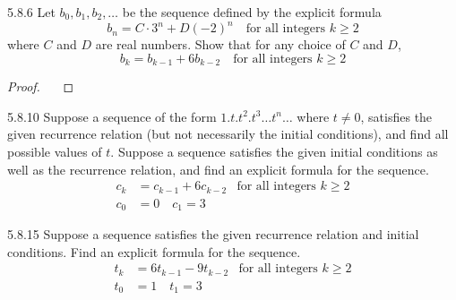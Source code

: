 \documentclass[11pt]{article}
\newcommand{\todo}{\fbox{TO-DO}\ \ } %
\begin{document}
{\raggedright}
\newcommand\NAME{Ojas Chaturvedi}  %
\newcommand\EMAILID{oj.chaturvedi.2024@gmail.com}
\newcommand\HWNUM{10} 


\begin{question}
    {5.8.6}
    {
        Let $b_0, b_1, b_2, \ldots$ be the sequence defined by the explicit formula
        \begin{equation*}
            b_n = C \cdot 3^n + D{(-2)}^n \quad \text{for all integers $k \geq 2$}
        \end{equation*}
        where $C$ and $D$ are real numbers. Show that for any choice of $C$ and $D$,
        \begin{equation*}
            b_k = b_{k-1} + 6b_{k-2} \quad \text{for all integers $k \geq 2$}
        \end{equation*}
        \vspace{-\baselineskip}
    }
\end{question}
\begin{proof}
    {\todo}
\end{proof}

\begin{question}
    {5.8.10}
    {
        Suppose a sequence of the form $1.t.t^2.t^3 \ldots t^n \ldots$ where $t \neq 0$, satisfies the given recurrence relation (but not necessarily the initial conditions), and find all possible values of $t$.
        Suppose a sequence satisfies the given initial conditions as well as the recurrence relation, and find an explicit formula for the sequence.
        \begin{align*}
            c_k &= c_{k-1} + 6c_{k-2} & \text{for all integers $k \geq 2$} \\
            c_0 &= 0 \quad c_1=3
        \end{align*}
        \vspace{-\baselineskip}
    }
\end{question}

\begin{question}
    {5.8.15}
    {
        Suppose a sequence satisfies the given recurrence relation and initial conditions. Find an explicit formula for the sequence.
        \begin{align*}
            t_k &= 6t_{k-1} - 9t_{k-2} & \text{for all integers $k \geq 2$} \\
            t_0 &= 1 \quad t_1=3
        \end{align*}
        \vspace{-\baselineskip}
    }
\end{question}
\end{document}
